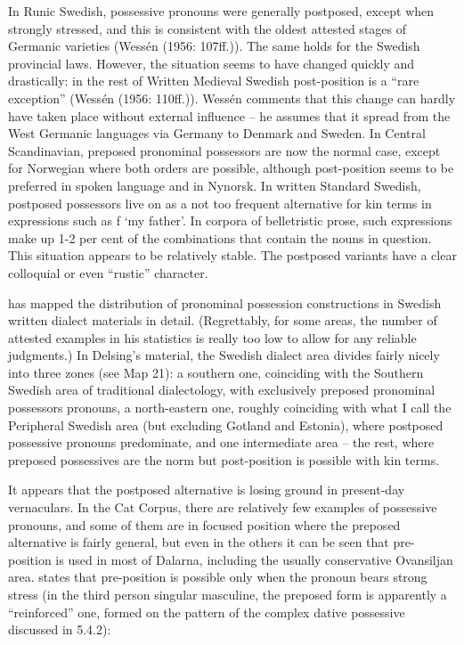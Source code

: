 
In Runic Swedish, possessive pronouns were generally postposed, except when strongly stressed, and this is consistent with the oldest attested stages of Germanic varieties (Wessén (1956: 107ff.)). The same holds for the Swedish provincial laws. However, the situation seems to have changed quickly and drastically: in the rest of Written Medieval Swedish post-position is a “rare exception” (Wessén (1956: 110ff.)). Wessén comments that this change can hardly have taken place without external influence – he assumes that it spread from the West Germanic languages via Germany to Denmark and Sweden. In Central Scandinavian, preposed pronominal possessors are now the normal case, except for Norwegian where both orders are possible, although post-position seems to be preferred in spoken language and in Nynorsk. In written Standard Swedish, postposed possessors live on as a not too frequent alternative for kin terms in expressions such as f ‘my father’. In corpora of belletristic prose, such expressions make up 1-2 per cent of the combinations that contain the nouns in question. This situation appears to be relatively stable. The postposed variants have a clear colloquial or even “rustic” character. 


\citet[32]{Delsing2003a} has mapped the distribution of pronominal possession constructions in Swedish written dialect materials in detail. (Regrettably, for some areas, the number of attested examples in his statistics is really too low to allow for any reliable judgments.) In Delsing’s material, the Swedish dialect area divides fairly nicely into three zones (see Map 21): a southern one, coinciding with the Southern Swedish area of traditional dialectology, with exclusively preposed pronominal possessors pronouns, a north-eastern one, roughly coinciding with what I call the Peripheral Swedish area (but excluding Gotland and Estonia), where postposed possessive pronouns predominate, and one intermediate area – the rest, where preposed possessives are the norm but post-position is possible with kin terms.


It appears that the postposed alternative is losing ground in present-day vernaculars. In the Cat Corpus, there are relatively few examples of possessive pronouns, and some of them are in focused position where the preposed alternative is fairly general, but even in the others it can be seen that pre-position is used in most of Dalarna, including the usually conservative Ovansiljan area. \citet[111]{Levander1909} states that pre-position is possible only when the pronoun bears strong stress (in the third person singular masculine, the preposed form is apparently a “reinforced” one, formed on the pattern of the complex dative possessive discussed in 5.4.2):

